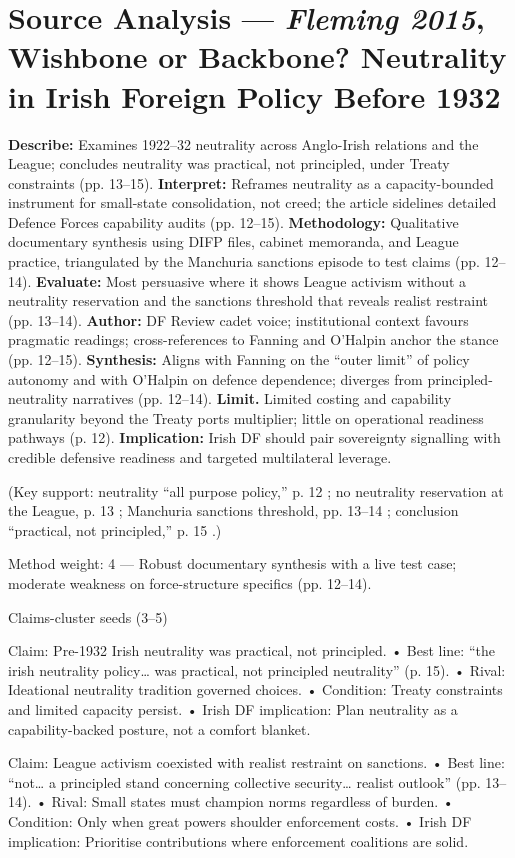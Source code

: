 \section*{Source Analysis — \textit{Fleming 2015}, Wishbone or Backbone? Neutrality in Irish Foreign Policy Before 1932}
\textbf{Describe:} Examines 1922–32 neutrality across Anglo-Irish relations and the League; concludes neutrality was practical, not principled, under Treaty constraints (pp. 13–15).
\textbf{Interpret:} Reframes neutrality as a capacity-bounded instrument for small-state consolidation, not creed; the article sidelines detailed Defence Forces capability audits (pp. 12–15).
\textbf{Methodology:} Qualitative documentary synthesis using DIFP files, cabinet memoranda, and League practice, triangulated by the Manchuria sanctions episode to test claims (pp. 12–14).
\textbf{Evaluate:} Most persuasive where it shows League activism without a neutrality reservation and the sanctions threshold that reveals realist restraint (pp. 13–14).
\textbf{Author:} DF Review cadet voice; institutional context favours pragmatic readings; cross-references to Fanning and O’Halpin anchor the stance (pp. 12–15).
\textbf{Synthesis:} Aligns with Fanning on the “outer limit” of policy autonomy and with O’Halpin on defence dependence; diverges from principled-neutrality narratives (pp. 12–14).
\textbf{Limit.} Limited costing and capability granularity beyond the Treaty ports multiplier; little on operational readiness pathways (p. 12).
\textbf{Implication:} Irish DF should pair sovereignty signalling with credible defensive readiness and targeted multilateral leverage.

(Key support: neutrality “all purpose policy,” p. 12 ; no neutrality reservation at the League, p. 13 ; Manchuria sanctions threshold, pp. 13–14 ; conclusion “practical, not principled,” p. 15 .)

Method weight: 4 — Robust documentary synthesis with a live test case; moderate weakness on force-structure specifics (pp. 12–14).

Claims-cluster seeds (3–5)

Claim: Pre-1932 Irish neutrality was practical, not principled.
• Best line: “the irish neutrality policy… was practical, not principled neutrality” (p. 15).
• Rival: Ideational neutrality tradition governed choices.
• Condition: Treaty constraints and limited capacity persist.
• Irish DF implication: Plan neutrality as a capability-backed posture, not a comfort blanket.

Claim: League activism coexisted with realist restraint on sanctions.
• Best line: “not… a principled stand concerning collective security… realist outlook” (pp. 13–14).
• Rival: Small states must champion norms regardless of burden.
• Condition: Only when great powers shoulder enforcement costs.
• Irish DF implication: Prioritise contributions where enforcement coalitions are solid.

